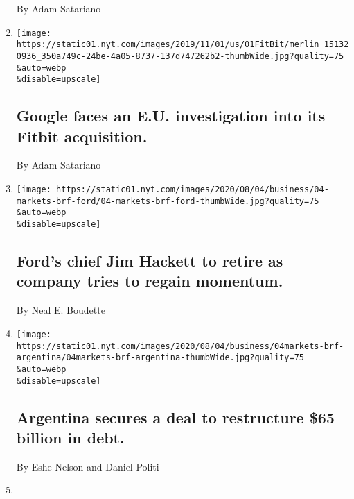 \begin{enumerate}
  By Adam Satariano
\item
  \href{/2020/08/04/business/google-faces-an-eu-investigation-into-its-fitbit-acquisition.html}{}

  \texttt{[image: https://static01.nyt.com/images/2019/11/01/us/01FitBit/merlin\_151320936\_350a749c-24be-4a05-8737-137d747262b2-thumbWide.jpg?quality=75\\\&auto=webp\\\&disable=upscale]}

  \hypertarget{google-faces-an-eu-investigation-into-its-fitbit-acquisition}{%
  \subsection{Google faces an E.U. investigation into its Fitbit
  acquisition.}\label{google-faces-an-eu-investigation-into-its-fitbit-acquisition}}

  By Adam Satariano
\item
  \href{/2020/08/04/business/fords-chief-jim-hackett-to-retire-as-company-tries-to-regain-momentum.html}{}

  \texttt{[image: https://static01.nyt.com/images/2020/08/04/business/04-markets-brf-ford/04-markets-brf-ford-thumbWide.jpg?quality=75\\\&auto=webp\\\&disable=upscale]}

  \hypertarget{fords-chief-jim-hackett-to-retire-as-company-tries-to-regain-momentum}{%
  \subsection{Ford's chief Jim Hackett to retire as company tries to
  regain
  momentum.}\label{fords-chief-jim-hackett-to-retire-as-company-tries-to-regain-momentum}}

  By Neal E. Boudette
\item
  \href{/2020/08/04/business/argentina-secures-a-deal-to-restructure-65-billion-in-debt.html}{}

  \texttt{[image: https://static01.nyt.com/images/2020/08/04/business/04markets-brf-argentina/04markets-brf-argentina-thumbWide.jpg?quality=75\\\&auto=webp\\\&disable=upscale]}

  \hypertarget{argentina-secures-a-deal-to-restructure-65-billion-in-debt}{%
  \subsection{Argentina secures a deal to restructure \$65 billion in
  debt.}\label{argentina-secures-a-deal-to-restructure-65-billion-in-debt}}

  By Eshe Nelson and Daniel Politi
\item
  \href{/2020/08/04/business/bp-to-step-up-renewable-investment-as-it-reports-a-huge-loss.html}{}


\end{enumerate}
